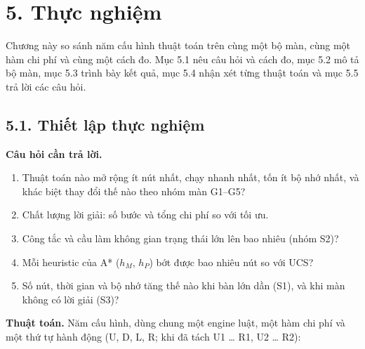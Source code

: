 \section{5. Thực nghiệm}

Chương này so sánh năm cấu hình thuật toán trên cùng một bộ màn, cùng một hàm chi phí và cùng một cách đo. Mục 5.1 nêu câu hỏi và cách đo, mục 5.2 mô tả bộ màn, mục 5.3 trình bày kết quả, mục 5.4 nhận xét từng thuật toán và mục 5.5 trả lời các câu hỏi.

\subsection{5.1. Thiết lập thực nghiệm}

\textbf{Câu hỏi cần trả lời.}

\begin{enumerate}
\def\labelenumi{\arabic{enumi}.}
\tightlist
\item
  Thuật toán nào mở rộng ít nút nhất, chạy nhanh nhất, tốn ít bộ nhớ nhất, và khác biệt thay đổi thế nào theo nhóm màn G1--G5?
\item
  Chất lượng lời giải: số bước và tổng chi phí so với tối ưu.
\item
  Công tắc và cầu làm không gian trạng thái lớn lên bao nhiêu (nhóm S2)?
\item
  Mỗi heuristic của A* (\(h_M\), \(h_P\)) bớt được bao nhiêu nút so với UCS?
\item
  Số nút, thời gian và bộ nhớ tăng thế nào khi bàn lớn dần (S1), và khi màn không có lời giải (S3)?
\end{enumerate}

\textbf{Thuật toán.} Năm cấu hình, dùng chung một engine luật, một hàm chi phí và một thứ tự hành động (U, D, L, R; khi đã tách U1 \ldots{} R1, U2 \ldots{} R2):



